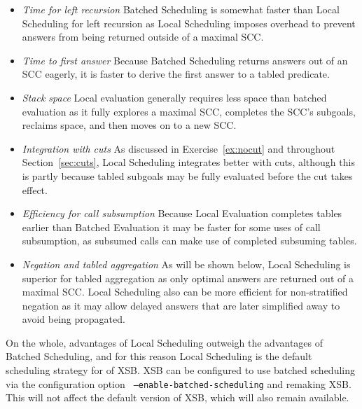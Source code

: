 \begin{itemize}

\item {\em Time for left recursion} Batched Scheduling is somewhat
  faster than Local Scheduling for left recursion as Local Scheduling
  imposes overhead to prevent answers from being returned outside of
  a maximal SCC.  

\item {\em Time to first answer}  Because Batched Scheduling returns
  answers out of an SCC eagerly, it is faster to derive the first
  answer to a tabled predicate.

\item {\em Stack space} Local evaluation generally requires less space
  than batched evaluation as it fully explores a maximal SCC,
  completes the SCC's subgoals, reclaims space, and then moves on to a
  new SCC.  

\item {\em Integration with cuts} As discussed in
  Exercise~\ref{ex:nocut} and throughout Section~\ref{sec:cuts}, Local
  Scheduling integrates better with cuts, although this is partly
  because tabled subgoals may be fully evaluated before the cut takes
  effect. 

\item {\em Efficiency for call subsumption} Because Local Evaluation
  completes tables earlier than Batched Evaluation it may be faster
  for some uses of call subsumption, as subsumed calls can make use of
  completed subsuming tables.

\item {\em Negation and tabled aggregation} As will be shown below,
  Local Scheduling is superior for tabled aggregation as only optimal
  answers are returned out of a maximal SCC.  Local Scheduling also
  can be more efficient for non-stratified negation as it may allow
  delayed answers that are later simplified away to avoid being
  propagated.
\end{itemize}

On the whole, advantages of Local Scheduling outweigh the advantages of
Batched Scheduling, and for this reason Local Scheduling is the
default scheduling strategy for \version{} of XSB.  XSB can be
configured to use batched scheduling via the configuration option {\tt
  --enable-batched-scheduling} and remaking XSB\@.  This will not
affect the default version of XSB, which will also remain available.


